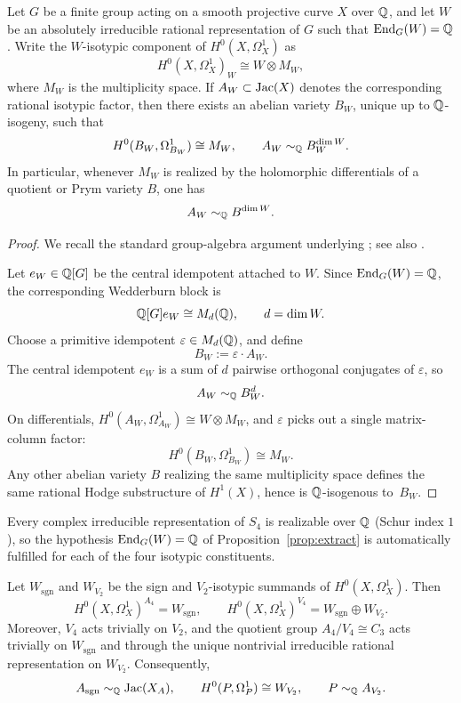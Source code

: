 \begin{proposition}\label{prop:extract}
Let \(G\) be a finite group acting on a smooth projective curve \(X\) over \(\mathbb{Q}\), and let \(W\) be an absolutely irreducible rational representation of \(G\) such that \(\operatorname{End}_G(W)=\mathbb{Q}\). Write the \(W\)-isotypic component of \(H^0(X,\Omega_X^1)\) as
\[
H^0(X,\Omega_X^1)_W\cong W\otimes M_W,
\]
where \(M_W\) is the multiplicity space.
If \(A_W\subset \operatorname{Jac}(X)\) denotes the corresponding rational isotypic factor, then there exists an abelian variety \(B_W\), unique up to \(\mathbb{Q}\)-isogeny, such that
\[
H^0(B_W,\Omega_{B_W}^1)\cong M_W,
\qquad
A_W\sim_{\mathbb{Q}} B_W^{\dim W}.
\]
In particular, whenever \(M_W\) is realized by the holomorphic differentials of a quotient or Prym variety \(B\), one has
\[
A_W\sim_{\mathbb{Q}} B^{\dim W}.
\]
\end{proposition}

\begin{proof}
We recall the standard group-algebra argument underlying \cite{KaniRosen1989}; see also \cite[Section~13.4]{BirkenhakeLange2004}.

Let \(e_W\in \mathbb{Q}[G]\) be the central idempotent attached to \(W\). Since \(\operatorname{End}_G(W)=\mathbb{Q}\), the corresponding Wedderburn block is
\[
\mathbb{Q}[G]e_W\cong M_d(\mathbb{Q}),\qquad d=\dim W.
\]
Choose a primitive idempotent \(\varepsilon\in M_d(\mathbb{Q})\), and define
\[
B_W:=\varepsilon\cdot A_W.
\]
The central idempotent \(e_W\) is a sum of \(d\) pairwise orthogonal conjugates of \(\varepsilon\), so
\[
A_W\sim_{\mathbb{Q}} B_W^d.
\]
On differentials, \(H^0(A_W,\Omega_{A_W}^1)\cong W\otimes M_W\), and \(\varepsilon\) picks out a single matrix-column factor:
\[
H^0(B_W,\Omega_{B_W}^1)\cong M_W.
\]
Any other abelian variety \(B\) realizing the same multiplicity space defines the same rational Hodge substructure of \(H^1(X)\), hence is \(\mathbb{Q}\)-isogenous to~\(B_W\).
\end{proof}

\begin{remark}\label{rem:schur}
Every complex irreducible representation of \(S_4\) is realizable over \(\mathbb{Q}\) (Schur index \(1\)), so the hypothesis \(\operatorname{End}_G(W)=\mathbb{Q}\) of Proposition~\ref{prop:extract} is automatically fulfilled for each of the four isotypic constituents.
\end{remark}

\begin{proposition}\label{prop:sgn-v2}
Let \(W_{\mathrm{sgn}}\) and \(W_{V_2}\) be the sign and \(V_2\)-isotypic summands of \(H^0(X,\Omega_X^1)\). Then
\[
H^0(X,\Omega_X^1)^{A_4}=W_{\mathrm{sgn}},
\qquad
H^0(X,\Omega_X^1)^{V_4}=W_{\mathrm{sgn}}\oplus W_{V_2}.
\]
Moreover, \(V_4\) acts trivially on \(V_2\), and the quotient group \(A_4/V_4\cong C_3\) acts trivially on \(W_{\mathrm{sgn}}\) and through the unique nontrivial irreducible rational representation on \(W_{V_2}\). Consequently,
\[
A_{\mathrm{sgn}}\sim_{\mathbb{Q}}\operatorname{Jac}(X_A),
\qquad
H^0(P,\Omega_P^1)\cong W_{V_2},
\qquad
P\sim_{\mathbb{Q}}A_{V_2}.
\]
\end{proposition}

